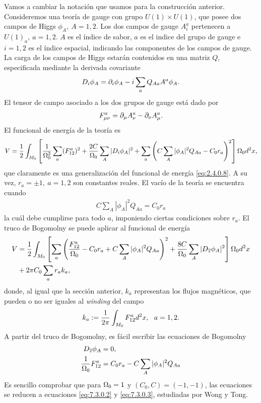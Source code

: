 Vamos a cambiar la notación que usamos para la construcción anterior. Consideremos una teoría de gauge con grupo $U(1)\times U(1)$, que posee dos campos de Higgs $\phi_A,\  A=1,2$. Los dos campos de gauge $A_i^a$ pertenecen a $U(1)_a,\ a=1,2$. $A$ es el índice de sabor, $a$ es el indice del grupo de gauge e $i=1,2$ es el índice espacial, indicando las componentes de los campos de gauge. La carga de los campos de Higgs estarán contenidos en una matriz $Q$, especificada mediante la derivada covariante
\begin{align}
	D_i\phi_A = \partial_i\phi_A-i\sum_a Q_{Aa}A^a\phi_A.
\end{align}
El tensor de campo asociado a los dos grupos de gauge está dado por
\begin{align}
	F^a_{\mu\nu} = \partial_\mu A^a_\nu-\partial_\nu A^a_\mu.
\end{align}
El funcional de energía de la teoría es
\begin{align}
	V = \frac{1}{2}\int_{M_0}\left[\frac{1}{\Omega_0^2}\sum_a(F^a_{12})^2+\frac{2C}{\Omega_0}\sum_A|D_i\phi_A|^2+\sum_a\left(C\sum_A|\phi_A|^2Q_{Aa}-C_0r_a\right)^2\right]\Omega_0 d^2x, \label{eq:7.3.0.15}
\end{align}
que claramente es una generalización del funcional de energía \eqref{eq:2.4.0.8}. A su vez, $r_a=\pm 1,\ a=1,2$ son constantes reales. El vacío de la teoría se encuentra cuando
\begin{align}
	C\sum_A|\phi_A|^2Q_{Aa} = C_0 r_a
\end{align}
la cuál debe cumplirse para todo $a$, imponiendo ciertas condiciones sobre $r_a$. El truco de Bogomolny se puede aplicar al funcional de energía
\begin{align}
	V & = \frac{1}{2}\int_{M_0}\left[\sum_a\left(\frac{F_{12}^a}{\Omega_0}-C_0r_a+C\sum_A|\phi_A|^2Q_{Aa}\right)^2+\frac{8C}{\Omega_0}\sum_A|D_{\overline z}\phi_A|^2\right]\Omega_0 d^2x\nonumber \\
	  & +2\pi C_0\sum_a r_a k_a,
\end{align}
donde, al igual que la sección anterior, $k_a$ representan los flujos magnéticos, que pueden o no ser iguales al \emph{winding} del campo
\begin{align}
	k_a := \frac{1}{2\pi}\int_{M_0} F_{12}^a d^2x , \ \ a=1,2.
\end{align}
A partir del truco de Bogomolny, es fácil escribir las ecuaciones de Bogomolny
\begin{align}
	D_{\overline z}\phi_A & = 0,                             \\
	\frac{1}{\Omega_0}F_{12}^a   & = C_0r_a-C\sum_A|\phi_A|^2Q_{Aa}
\end{align}
Es sencillo comprobar que para $\Omega_0=1$ y $(C_0,C)=(-1,-1)$, las ecuaciones se reducen a ecuaciones \eqref{eq:7.3.0.2} y \eqref{eq:7.3.0.3}, estudiadas por Wong y Tong.

